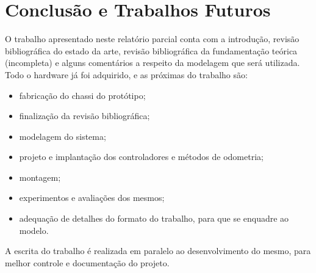 \section{Conclusão e Trabalhos Futuros}
\label{sec:resultados}

O trabalho apresentado neste relatório parcial conta com a introdução, revisão bibliográfica do estado da arte, revisão bibliográfica da fundamentação teórica (incompleta) e alguns comentários a respeito da modelagem que será utilizada. Todo o hardware já foi adquirido, e as próximas do trabalho são:
\begin{itemize}
  \item{fabricação do chassi do protótipo;}
  \item{finalização da revisão bibliográfica;}
  \item{modelagem do sistema;}
  \item{projeto e implantação dos controladores e métodos de odometria;}
  \item{montagem;}
  \item{experimentos e avaliações dos mesmos;}
  \item{adequação de detalhes do formato do trabalho, para que se enquadre ao modelo.}
\end{itemize}

A escrita do trabalho é realizada em paralelo ao desenvolvimento do mesmo, para melhor controle e documentação do projeto.
